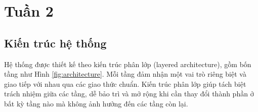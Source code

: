 \section{Tuần 2}

\subsection{Kiến trúc hệ thống}

\hspace{0.5cm} Hệ thống được thiết kế theo kiến trúc phân lớp (layered architecture), gồm bốn tầng như Hình \ref{fig:architecture}. Mỗi tầng đảm nhận một vai trò riêng biệt và giao tiếp với nhau qua các giao thức chuẩn. Kiến trúc phân lớp giúp tách biệt trách nhiệm giữa các tầng, dễ bảo trì và mở rộng khi cần thay đổi thành phần ở bất kỳ tầng nào mà không ảnh hưởng đến các tầng còn lại.

